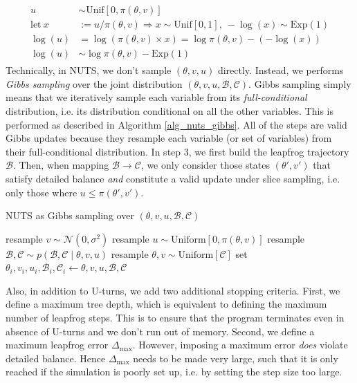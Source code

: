 \documentclass[12pt]{article}
\begin{document}
\begin{align}
\begin{split}
u &\sim \text{Unif}[0, \pi(\theta, v)] \\
\text{let} \ x &:= u/\pi(\theta, v) \Rightarrow x \sim \text{Unif}[0, 1], \  -\log(x) \sim \text{Exp}(1) \\
\log(u) &= \log(\pi(\theta, v) \times x) = \log\pi(\theta, v) - (-\log(x)) \\
\log(u) &\sim \log \pi(\theta, v) - \text{Exp}(1)
\end{split}
\label{eq_logu_distr}
\end{align}
Technically, in NUTS, we don't sample $(\theta,v,u)$ directly. Instead, we performs \textit{Gibbs sampling} over the joint distribution $(\theta, v, u, \mathcal{B}, \mathcal{C})$. Gibbs sampling simply means that we iteratively sample each variable from its \textit{full-conditional} distribution, i.e. its distribution conditional on all the other variables. This is performed as described in Algorithm \ref{alg_nuts_gibbs}. All of the steps are valid Gibbs updates because they resample each variable (or set of variables) from their full-conditional distribution. In step 3, we first build the leapfrog trajectory $\mathcal{B}$. Then, when mapping $\mathcal{B} \rightarrow \mathcal{C}$, we only consider those states $(\theta', v')$ that satisfy detailed balance \textit{and} constitute a valid update under slice sampling, i.e. only those where $u \leq \pi(\theta', v')$.

\begin{algorithm}
\caption{NUTS as Gibbs sampling over $(\theta, v, u, \mathcal{B}, \mathcal{C})$}
\label{alg_nuts_gibbs}
\begin{algorithmic}
	\State resample $v \sim \mathcal{N}(0, \sigma^2)$
	\State resample $u \sim \text{Uniform} [0, \pi(\theta, v)]$
	\State resample $\mathcal{B}, \mathcal{C} \sim p(\mathcal{B}, \mathcal{C} \mid \theta, v, u)$
	\State resample $\theta, v \sim \text{Uniform}[\mathcal{C}]$
	\State set $\theta_i, v_i, u_i, \mathcal{B}_i, \mathcal{C}_i \gets \theta, v, u, \mathcal{B}, \mathcal{C}$
\EndFor
\end{algorithmic}
\end{algorithm}

Also, in addition to U-turns, we add two additional stopping criteria. First, we define a maximum tree depth, which is equivalent to defining the maximum number of leapfrog steps. This is to ensure that the program terminates even in absence of U-turns and we don't run out of memory. Second, we define a maximum leapfrog error $\Delta_\text{max}$. However, imposing a maximum error \textit{does} violate detailed balance. Hence $\Delta_\text{max}$ needs to be made very large, such that it is only reached if the simulation is poorly set up, i.e. by setting the step size too large.
\end{document}
